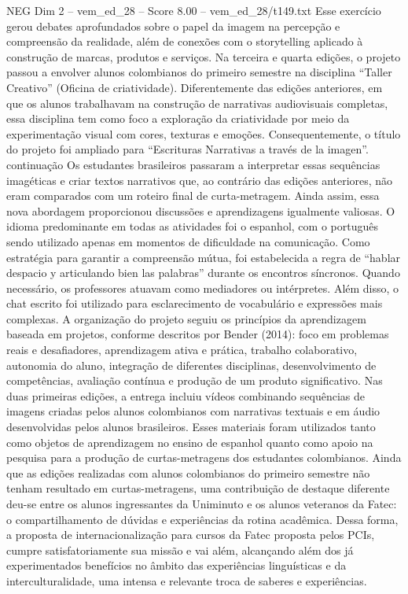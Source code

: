 \begin{textsample}{NEG Dim 2 – vem\_ed\_28 – Score 8.00 – vem\_ed\_28/t149.txt}
Esse exercício gerou debates aprofundados sobre o papel da imagem na percepção e compreensão da realidade, além de conexões com o storytelling aplicado à construção de marcas, produtos e serviços.
Na terceira e quarta edições, o projeto passou a envolver alunos colombianos do primeiro semestre na disciplina “Taller Creativo” (Oficina de criatividade).
Diferentemente das edições anteriores, em que os alunos trabalhavam na construção de narrativas audiovisuais completas, essa disciplina tem como foco a exploração da criatividade por meio da experimentação visual com cores, texturas e emoções.
Consequentemente, o título do projeto foi ampliado para “Escrituras Narrativas a través de la imagen”. continuação Os estudantes brasileiros passaram a interpretar essas sequências imagéticas e criar textos narrativos que, ao contrário das edições anteriores, não eram comparados com um roteiro final de curta-metragem.
Ainda assim, essa nova abordagem proporcionou discussões e aprendizagens igualmente valiosas.
O idioma predominante em todas as atividades foi o espanhol, com o português sendo utilizado apenas em momentos de dificuldade na comunicação.
Como estratégia para garantir a compreensão mútua, foi estabelecida a regra de “hablar despacio y articulando bien las palabras” durante os encontros síncronos.
Quando necessário, os professores atuavam como mediadores ou intérpretes.
Além disso, o chat escrito foi utilizado para esclarecimento de vocabulário e expressões mais complexas.
A organização do projeto seguiu os princípios da aprendizagem baseada em projetos, conforme descritos por Bender (2014): foco em problemas reais e desafiadores, aprendizagem ativa e prática, trabalho colaborativo, autonomia do aluno, integração de diferentes disciplinas, desenvolvimento de competências, avaliação contínua e produção de um produto significativo.
Nas duas primeiras edições, a entrega incluiu vídeos combinando sequências de imagens criadas pelos alunos colombianos com narrativas textuais e em áudio desenvolvidas pelos alunos brasileiros.
Esses materiais foram utilizados tanto como objetos de aprendizagem no ensino de espanhol quanto como apoio na pesquisa para a produção de curtas-metragens dos estudantes colombianos.
Ainda que as edições realizadas com alunos colombianos do primeiro semestre não tenham resultado em curtas-metragens, uma contribuição de destaque diferente deu-se entre os alunos ingressantes da Uniminuto e os alunos veteranos da Fatec: o compartilhamento de dúvidas e experiências da rotina acadêmica.
Dessa forma, a proposta de internacionalização para cursos da Fatec proposta pelos PCIs, cumpre satisfatoriamente sua missão e vai além, alcançando além dos já experimentados benefícios no âmbito das experiências linguísticas e da interculturalidade, uma intensa e relevante troca de saberes e experiências.

\end{textsample}
